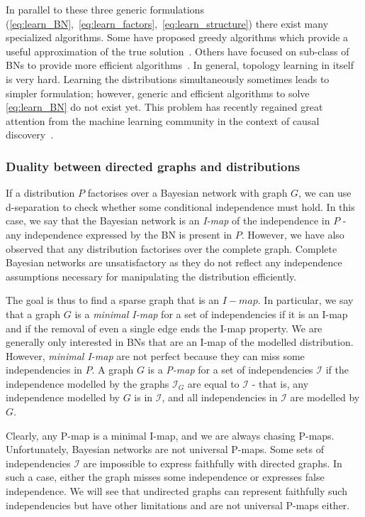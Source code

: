 In parallel to these three generic formulations (\ref{eq:learn_BN},~\ref{eq:learn_factors},~\ref{eq:learn_structure}) there exist many specialized algorithms. Some have proposed greedy algorithms which provide a useful approximation of the true solution~\citep{tsamardinos2006max}. Others have focused on sub-class of BNs to provide more efficient algorithms~\citep{cooper1992bayesian, chow1968approximating}. In general, topology learning in itself is very hard. Learning the distributions simultaneously sometimes leads to simpler formulation; however, generic and efficient algorithms to solve \eqref{eq:learn_BN} do not exist yet. This problem has recently regained great attention from the machine learning community in the context of causal discovery~\citep{khemakhem_causal_2020, balgi2022counterfactual, vowels2021d, brouillard2020differentiable}.


\subsubsection{Duality between directed graphs and distributions}
If a distribution $P$ factorises over a Bayesian network with graph $G$, we can use d-separation to check whether some conditional independence must hold. In this case, we say that the Bayesian network is an \textit{I-map} of the independence in $P$ - any independence expressed by the BN is present in $P$. However, we have also observed that any distribution factorises over the complete graph. Complete Bayesian networks are unsatisfactory as they do not reflect any independence assumptions necessary for manipulating the distribution efficiently.

The goal is thus to find a sparse graph that is an $I-map$. In particular, we say that a graph $G$ is a \textit{minimal I-map} for a set of independencies if it is an I-map and if the removal of even a single edge ends the I-map property. We are generally only interested in BNs that are an I-map of the modelled distribution. However, \textit{minimal I-map} are not perfect because they can miss some independencies in $P$. A graph $G$ is a \textit{P-map} for a set of independencies $\mathcal{I}$ if the independence modelled by the graphs $\mathcal{I}_G$ are equal to $\mathcal{I}$ - that is, any independence modelled by $G$ is in $\mathcal{I}$, and all independencies in $\mathcal{I}$ are modelled by  $G$.

Clearly, any P-map is a minimal I-map, and we are always chasing P-maps. Unfortunately, Bayesian networks are not universal P-maps. Some sets of independencies $\mathcal{I}$ are impossible to express faithfully with directed graphs. In such a case, either the graph misses some independence or expresses false independence. We will see that undirected graphs can represent faithfully such independencies but have other limitations and are not universal P-maps either.
